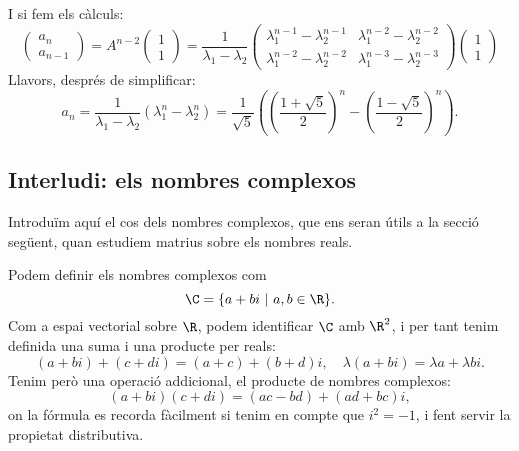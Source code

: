 I si fem els càlculs:
\[
\begin{pmatrix}
a_n\\a_{n-1}
\end{pmatrix}=
A^{n-2} \begin{pmatrix} 1 \\ 1 \end{pmatrix}=
\frac{1}{\lambda_1-\lambda_2} \begin{pmatrix}
\lambda_1^{n-1}-\lambda_2^{n-1} &
\lambda_1^{n-2}-\lambda_2^{n-2} \\
\lambda_1^{n-2}-\lambda_2^{n-2} &
\lambda_1^{n-3}-\lambda_2^{n-3} 
\end{pmatrix}\begin{pmatrix} 1 \\ 1 \end{pmatrix}
\]
Llavors, després de simplificar:
\[
a_n= \frac{1}{\lambda_1-\lambda_2}(\lambda_1^n-\lambda_2^n)=\frac{1}{\sqrt{5}}\left(
\left(\frac{1+\sqrt{5}}{2}\right)^n-\left(\frac{1-\sqrt{5}}{2}\right)^n
\right).
\]
\subsection{Interludi: els nombres complexos}
\label{sec:complexos}
Introduïm aquí el cos dels nombres complexos, que ens seran útils a la secció següent, quan estudiem matrius sobre els nombres reals.

Podem definir els nombres complexos com
\[
\C =\{a+bi ~|~ a,b\in\R\}.
\]
Com a espai vectorial sobre $\R$, podem identificar $\C$ amb $\R^2$, i per tant tenim definida una suma i una producte per reals:
\[
(a+bi) + (c+di) = (a+c) + (b+d)i, \quad \lambda(a+bi)=\lambda a + \lambda b i.
\]
Tenim però una operació addicional, el producte de nombres complexos:
\[
(a+bi)(c+di) = (ac-bd) + (ad+bc)i,
\]
on la fórmula es recorda fàcilment si tenim en compte que $i^2=-1$, i fent servir la propietat distributiva.

